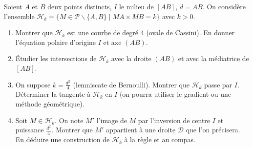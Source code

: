 \documentclass[11pt]{article}
\def\setminus{\mathbin{\backslash}}\let\smallsetminus\setminus
\begin{document}
\begin{exercice}[Lignes de niveau $MA \cdot MB = k$ et transformation d'inversion]
Soient $A$ et $B$ deux points distincts, $I$ le milieu de $[AB]$, $d = AB$. On considère l'ensemble $\mathcal{H}_k = \{ M \in \mathcal{P} \setminus \{A,B\} \mid MA \times MB = k \}$ avec $k > 0$.
\begin{enumerate}
    \item Montrer que $\mathcal{H}_k$ est une courbe de degré 4 (ovale de Cassini). En donner l'équation polaire d'origine $I$ et axe $(AB)$.
    \item Étudier les intersections de $\mathcal{H}_k$ avec la droite $(AB)$ et avec la médiatrice de $[AB]$.
    \item On suppose $k = \frac{d^2}{4}$ (lemniscate de Bernoulli). Montrer que $\mathcal{H}_k$ passe par $I$. Déterminer la tangente à $\mathcal{H}_k$ en $I$ (on pourra utiliser le gradient ou une méthode géométrique).
    \item Soit $M \in \mathcal{H}_k$. On note $M'$ l'image de $M$ par l'inversion de centre $I$ et puissance $\frac{d^2}{4}$. Montrer que $M'$ appartient à une droite $\mathcal{D}$ que l'on précisera. En déduire une construction de $\mathcal{H}_k$ à la règle et au compas.
\end{enumerate}
\end{exercice}
\end{document}
